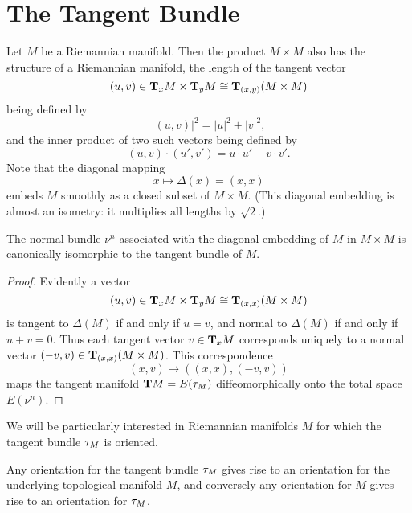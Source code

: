 \documentclass[../main]{subfiles}
\begin{document}
\section{The Tangent Bundle}
Let $M$ be a Riemannian manifold. Then the product $M \times M$ also has the structure of a Riemannian manifold, the length of the tangent vector \[(u, v) \in \tangentspace M x \times \tangentspace M y \cong \tangentspace {(M \times M)} {(x, y)}\] being defined by \[|(u, v)|^2 = |u|^2 + |v|^2,\] and the inner product of two such vectors being defined by \[(u, v) \cdot (u', v') = u \cdot u' + v \cdot v'.\] Note that the diagonal mapping \[x \mapsto \Delta(x) = (x, x)\] embeds $M$ smoothly as a closed subset of $M \times M$. (This diagonal embedding is almost an isometry: it multiplies all lengths by $\sqrt 2$.)

\begin{lemma}\label{lem:11.5}
The normal bundle $\nu^n$ associated with the diagonal embedding of $M$ in $M \times M$ is canonically isomorphic to the tangent bundle of $M$. 
\end{lemma}

\begin{proof}
Evidently a vector \[(u, v) \in \tangentspace M x \times \tangentspace M y \cong \tangentspace {(M \times M)} {(x, x)}\] is tangent to $\Delta(M)$ if and only if $u = v$, and normal to $\Delta(M)$ if and only if $u + v = 0$. Thus each tangent vector $v \in \tangentspace M x$ corresponds uniquely to a normal vector $(-v, v) \in \tangentspace {(M \times M)} {(x, x)}$. This correspondence \[(x, v) \mapsto ((x, x), (-v, v))\] maps the tangent manifold $\tangentTS M = E(\tangentbundle M)$ diffeomorphically onto the total space $E(\nu^n)$.
\end{proof}

We will be particularly interested in Riemannian manifolds $M$ for which the tangent bundle $\tangentbundle M$ is oriented. 

\begin{lemma}
\label{lem:11.6}
Any orientation for the tangent bundle $\tangentbundle M$ gives rise to an orientation for the underlying topological manifold $M$, and conversely any orientation for $M$ gives rise to an orientation for $\tangentbundle M$. 
\end{lemma}
\end{document}
